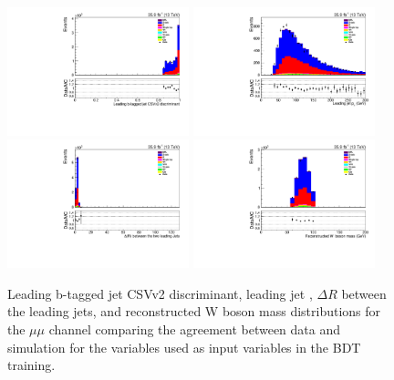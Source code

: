 \begin{figure}[!Htb]
\centering
\includegraphics[width=0.47\textwidth]{figs/background-estimation/plots/unblinded/prompt_mumu_ttbarInc/bTagDisc_NPL_mumu_wMass_mumu.pdf}
\includegraphics[width=0.47\textwidth]{figs/background-estimation/plots/unblinded/prompt_mumu_ttbarInc/leadingJetPt_NPL_mumu_wMass_mumu.pdf}
\\
\includegraphics[width=0.47\textwidth]{figs/background-estimation/plots/unblinded/prompt_mumu_ttbarInc/jjDelR_NPL_mumu_wMass_mumu.pdf}
\includegraphics[width=0.47\textwidth]{figs/background-estimation/plots/unblinded/prompt_mumu_ttbarInc/wPairMass_NPL_mumu_wMass_mumu.pdf}
\caption{
Leading b-tagged jet CSVv2 discriminant, leading jet \pT, $\Delta R$ between the leading jets, and reconstructed W boson mass distributions for the $\mu\mu$ channel comparing the agreement between data and simulation for the variables used as input variables in the BDT training.}
\label{fig:inputFeaturesDataSimAgreement2}
\end{figure}

